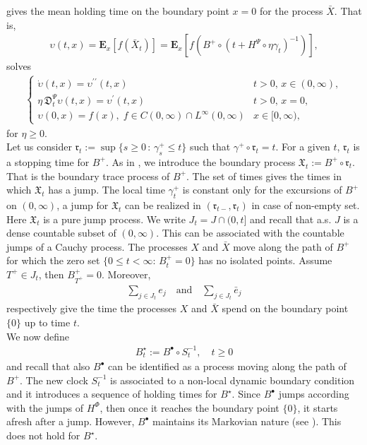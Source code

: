 \documentclass[11pt,a4paper]{article}
\theoremstyle{plain}
\theoremstyle{definition}
\theoremstyle{remark}
\begin{document}
		gives the mean holding time on the boundary point $x=0$ for the process $\bar{X}$. That is, 
		\begin{align*}
			\upsilon(t,x) = \mathbf{E}_x\left[f(\bar{X}_t)\right] = \mathbf{E}_x\left[f(B^+ \circ (t + H^\Psi \circ \eta \gamma_t)^{-1}) \right],
		\end{align*}
		solves
		\begin{align*}
			\begin{cases}
				\displaystyle \dot{\upsilon}(t,x)= \upsilon^{\prime \prime}(t,x) & t>0,\, x \in (0,\infty), \\
				\displaystyle \eta\, \mathfrak{D}^\Psi_t \upsilon(t,x) = \upsilon^\prime(t,x) & t>0,\, x=0,\\
				\displaystyle \upsilon(0,x)=f(x), \; f \in C(0, \infty) \cap L^\infty(0, \infty) & x \in [0, \infty),
			\end{cases}
		\end{align*}
		for $\eta \geq 0$.\\
		
		Let us consider $\mathfrak{r}_t:=\sup\{s\geq 0\,:\, \gamma^+_s \leq t\}$ such that $\gamma^+ \circ \mathfrak{r}_t = t$. For a given $t$, $\mathfrak{r}_t$ is a stopping time for $B^+$. As in \cite{HSU}, we introduce the boundary process $\mathfrak{X}_t := B^+ \circ \mathfrak{r}_t$. That is the boundary trace process of $B^+$. The set of times  gives the times in which $\mathfrak{X}_t$ has a jump. The local time $\gamma^+_t$ is constant only for the excursions of $B^+$ on $(0,\infty)$, a jump for $\mathfrak{X}_t$ can be realized in $(\mathfrak{r}_{t-}, \mathfrak{r}_t)$ in case of non-empty set. Here $\mathfrak{X}_t$ is a pure jump process. We write $J_t = J \cap (0,t]$ and recall that a.s. $J$ is a dense countable subset of $(0,\infty)$. This can be associated with the countable jumps of a Cauchy process. The processes $X$ and $\bar{X}$ move along the path of $B^+$ for which the zero set $\{0\leq t < \infty :\, B^+_t=0\}$ has no isolated points. Assume $T^+ \in J_t$, then $B^+_{T^+}=0$. Moreover,
		\begin{align*}
			\sum_{ j \in J_t} e_j \quad \textrm{and} \quad \sum_{j \in J_t} \bar{e}_j
		\end{align*}
		respectively give the time the processes $X$ and $\bar{X}$ spend on the boundary point $\{0\}$ up to time $t$. \\
		
		We now define
		\begin{align*}
			B^\star_t := B^\bullet \circ S^{-1}_t, \quad t\geq 0
		\end{align*}
		and recall that also $B^\bullet$ can be identified as a process moving along the path of $B^+$. The new clock $S_t^{-1}$ is associated to a non-local dynamic boundary condition and it  introduces a sequence of holding times for $B^\star$. Since $B^\bullet$ jumps according with the jumps of $H^\Phi$, then once it reaches the boundary point $\{0\}$, it starts afresh after a jump. However, $B^\bullet$ maintains its Markovian nature (see \cite[Section 13]{ito1963brownian}). This does not hold for $B^\star$.\\ 
		
\end{document}
